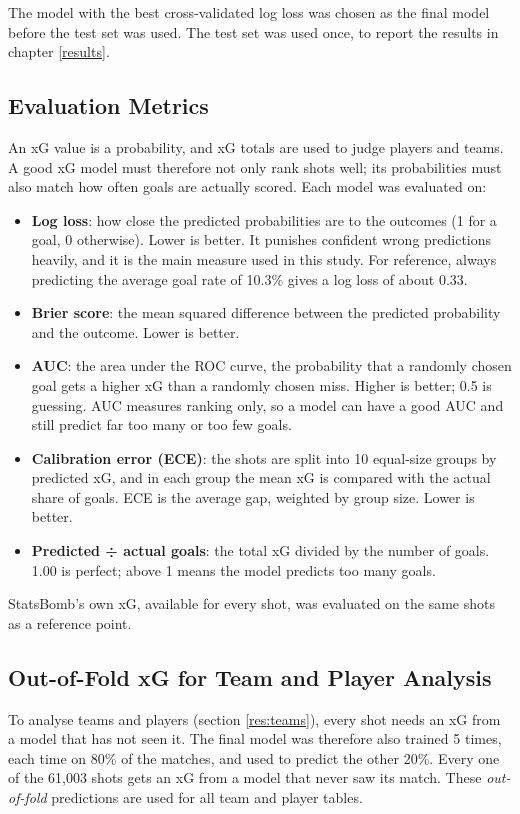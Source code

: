 The model with the best cross-validated log loss was chosen as the final model before the test set was used. The test set was used once, to report the results in chapter \ref{results}.

\subsection{Evaluation Metrics}

An xG value is a probability, and xG totals are used to judge players and teams. A good xG model must therefore not only rank shots well; its probabilities must also match how often goals are actually scored. Each model was evaluated on:
\begin{itemize}
    \item \textbf{Log loss}: how close the predicted probabilities are to the outcomes (1 for a goal, 0 otherwise). Lower is better. It punishes confident wrong predictions heavily, and it is the main measure used in this study. For reference, always predicting the average goal rate of 10.3\% gives a log loss of about 0.33.
    \item \textbf{Brier score}: the mean squared difference between the predicted probability and the outcome. Lower is better.
    \item \textbf{AUC}: the area under the ROC curve, the probability that a randomly chosen goal gets a higher xG than a randomly chosen miss. Higher is better; 0.5 is guessing. AUC measures ranking only, so a model can have a good AUC and still predict far too many or too few goals.
    \item \textbf{Calibration error (ECE)}: the shots are split into 10 equal-size groups by predicted xG, and in each group the mean xG is compared with the actual share of goals. ECE is the average gap, weighted by group size. Lower is better.
    \item \textbf{Predicted ÷ actual goals}: the total xG divided by the number of goals. 1.00 is perfect; above 1 means the model predicts too many goals.
\end{itemize}

StatsBomb's own xG, available for every shot, was evaluated on the same shots as a reference point.

\subsection{Out-of-Fold xG for Team and Player Analysis}

To analyse teams and players (section \ref{res:teams}), every shot needs an xG from a model that has not seen it. The final model was therefore also trained 5 times, each time on 80\% of the matches, and used to predict the other 20\%. Every one of the 61,003 shots gets an xG from a model that never saw its match. These \textit{out-of-fold} predictions are used for all team and player tables.
